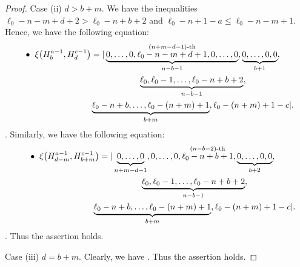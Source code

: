 \documentclass[pdftex]{sigma}
\numberwithin{equation}{section}
\begin{document}
\begin{proof}
Case (ii) $d>b+m$.
We have the inequalities $\ell_0-n-m+d+2>\ell_0-n+b+2$ and $\ell_0-n+1-a\leq \ell_0-n-m+1$. Hence, we have the following equation:
\begin{gather*}
\hspace{-3.85mm}\bullet\hspace{2mm}
\xi\bigl(H^{a-1}_{b},H^{c-1}_{d}\bigr)=|\underbrace{0,\dots,0,%
\stackrel{(n+m-d-1)\text{-th}}{\ell_0-n-m+d+1},0,\dots,0}_{n-b-1},\underbrace{0,\dots,0,0}_{b+1},\\
\hphantom{\hspace{-3.85mm}\bullet\hspace{2mm}\xi\bigl(H^{a-1}_{b},H^{c-1}_{d}\bigr)=|}{}
\underbrace{\ell_{0},\ell_{0}-1,\dots,\ell_{0}-n+b+2}_{n-b-1},\\
\hphantom{\hspace{-3.85mm}\bullet\hspace{2mm}\xi\bigl(H^{a-1}_{b},H^{c-1}_{d}\bigr)=|}{}
\underbrace{\ell_{0}-n+b,\dots,\ell_{0}-(n+m)+1}_{b+m},\ell_{0}-(n+m)+1-c|.%
\end{gather*}
. Similarly, we have the following equation:
\begin{gather*}
\hspace{-3.85mm}\bullet\hspace{2mm}
\xi\bigl(H^{a-1}_{d-m},H^{c-1}_{b+m}\bigr)=|\underbrace{0,\dots,0}_{n+m-d-1},%
0,\dots,0,\stackrel{(n-b-2)\text{-th}}{\ell_0-n+b+1},\underbrace{0,\dots,0,0}_{b+2},\nonumber\\
\hphantom{\xi\bigl(H^{a-1}_{d-m},H^{c-1}_{b+m}\bigr)=|}{}
\underbrace{\ell_{0},\ell_{0}-1,\dots,\ell_{0}-n+b+2}_{n-b-1},\\
\hphantom{\xi\bigl(H^{a-1}_{d-m},H^{c-1}_{b+m}\bigr)=|}{}
\underbrace{\ell_{0}-n+b,\dots,\ell_{0}-(n+m)+1}_{b+m},\ell_{0}-(n+m)+1-c|.%
\end{gather*}
. Thus the assertion holds.

Case (iii) $d=b+m$. Clearly, we have . Thus the assertion holds.


\end{proof}
\end{document}
